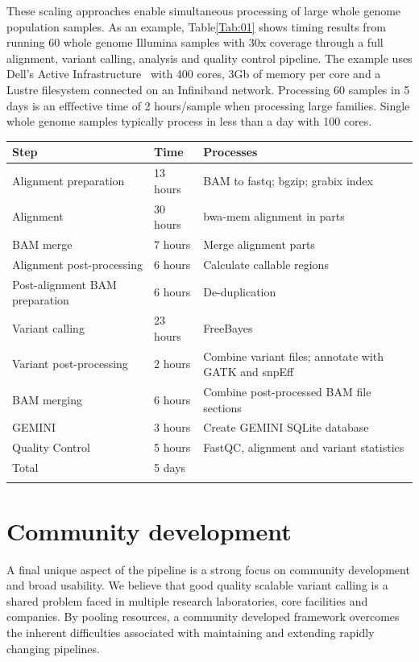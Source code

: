 \documentclass{frontiersSCNS}
\begin{document}
These scaling approaches enable simultaneous processing of large whole genome
population samples. As an example, Table\ref{Tab:01} shows timing results from
running 60 whole genome Illumina samples with 30x coverage through a full
alignment, variant calling, analysis and quality control pipeline. The example
uses Dell's Active Infrastructure~\citep{dell} with 400 cores, 3Gb of memory per
core and a Lustre filesystem connected on an Infiniband network.  Processing 60
samples in 5 days is an efffective time of 2 hours/sample when processing large
families. Single whole genome samples typically process in less than a day with
100 cores.

\begin{table}[!t]
{\begin{tabular}{lll}\toprule
Step & Time & Processes \\
\midrule
Alignment preparation & 13 hours & BAM to fastq; bgzip; grabix index \\
Alignment & 30 hours & bwa-mem alignment in parts \\
BAM merge & 7 hours & Merge alignment parts \\
Alignment post-processing & 6 hours & Calculate callable regions \\
Post-alignment BAM preparation & 6 hours & De-duplication \\
Variant calling & 23 hours & FreeBayes \\
Variant post-processing & 2 hours & Combine variant files; annotate with GATK and snpEff \\
BAM merging & 6 hours & Combine post-processed BAM file sections \\
GEMINI & 3 hours & Create GEMINI SQLite database \\
Quality Control & 5 hours & FastQC, alignment and variant statistics \\
\midrule
Total & 5 days & \\
\botrule
\end{tabular}}{}
\end{table}

\FloatBarrier

\section*{Community development}

A final unique aspect of the pipeline is a strong focus on community development
and broad usability. We believe that good quality scalable variant calling is a
shared problem faced in multiple research laboratories, core facilities and
companies.  By pooling resources, a community developed framework overcomes the
inherent difficulties associated with maintaining and extending rapidly changing
pipelines.
\end{document}
